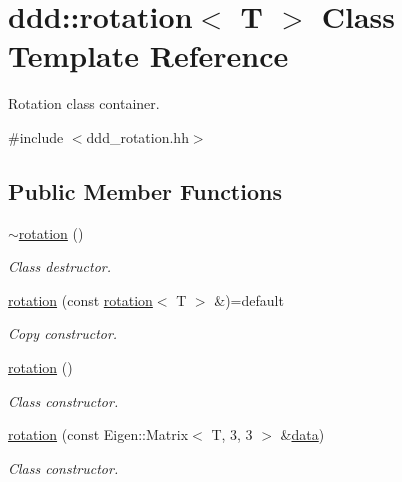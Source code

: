 \hypertarget{classddd_1_1rotation}{}\section{ddd\+:\+:rotation$<$ T $>$ Class Template Reference}
\label{classddd_1_1rotation}


Rotation class container.  




{\ttfamily \#include $<$ddd\+\_\+rotation.\+hh$>$}

\subsection*{Public Member Functions}
\begin{DoxyCompactItemize}
\item 
\mbox{\label{classddd_1_1rotation_a35f5c1346155a56b191f297b6578aa31}} 
\hyperlink{classddd_1_1rotation_a35f5c1346155a56b191f297b6578aa31}{$\sim$rotation} ()
\begin{DoxyCompactList}\small\item\em Class destructor. \end{DoxyCompactList}\item 
\mbox{\label{classddd_1_1rotation_a8f53c26dd4172728641b5cd29b2e1c7b}} 
\hyperlink{classddd_1_1rotation_a8f53c26dd4172728641b5cd29b2e1c7b}{rotation} (const \hyperlink{classddd_1_1rotation}{rotation}$<$ T $>$ \&)=default
\begin{DoxyCompactList}\small\item\em Copy constructor. \end{DoxyCompactList}\item 
\mbox{\label{classddd_1_1rotation_a3c41c8ce3effc94658cf4cf5fa229e65}} 
\hyperlink{classddd_1_1rotation_a3c41c8ce3effc94658cf4cf5fa229e65}{rotation} ()
\begin{DoxyCompactList}\small\item\em Class constructor. \end{DoxyCompactList}\item 
\hyperlink{classddd_1_1rotation_a10b7bcc20f352a49767460ebde9a1fcf}{rotation} (const Eigen\+::\+Matrix$<$ T, 3, 3 $>$ \&\hyperlink{classddd_1_1rotation_a96ca78d491ccc1c1c5b6be44c18e5abd}{data})
\begin{DoxyCompactList}\small\item\em Class constructor. \end{DoxyCompactList}\item 

\end{DoxyCompactItemize}
